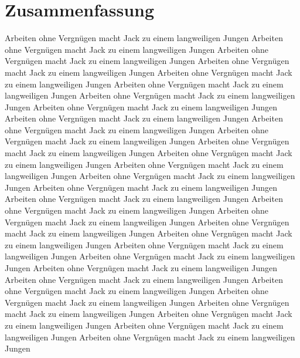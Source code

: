 \section*{Zusammenfassung}

Arbeiten ohne Vergnügen macht Jack zu einem langweiligen Jungen
Arbeiten ohne Vergnügen macht Jack zu einem langweiligen Jungen
Arbeiten ohne Vergnügen macht Jack zu einem langweiligen Jungen
Arbeiten ohne Vergnügen macht Jack zu einem langweiligen Jungen
Arbeiten ohne Vergnügen macht Jack zu einem langweiligen Jungen
Arbeiten ohne Vergnügen macht Jack zu einem langweiligen Jungen
Arbeiten ohne Vergnügen macht Jack zu einem langweiligen Jungen
Arbeiten ohne Vergnügen macht Jack zu einem langweiligen Jungen
Arbeiten ohne Vergnügen macht Jack zu einem langweiligen Jungen
Arbeiten ohne Vergnügen macht Jack zu einem langweiligen Jungen
Arbeiten ohne Vergnügen macht Jack zu einem langweiligen Jungen
Arbeiten ohne Vergnügen macht Jack zu einem langweiligen Jungen
Arbeiten ohne Vergnügen macht Jack zu einem langweiligen Jungen
Arbeiten ohne Vergnügen macht Jack zu einem langweiligen Jungen
Arbeiten ohne Vergnügen macht Jack zu einem langweiligen Jungen
Arbeiten ohne Vergnügen macht Jack zu einem langweiligen Jungen
Arbeiten ohne Vergnügen macht Jack zu einem langweiligen Jungen
Arbeiten ohne Vergnügen macht Jack zu einem langweiligen Jungen
Arbeiten ohne Vergnügen macht Jack zu einem langweiligen Jungen
Arbeiten ohne Vergnügen macht Jack zu einem langweiligen Jungen
Arbeiten ohne Vergnügen macht Jack zu einem langweiligen Jungen
Arbeiten ohne Vergnügen macht Jack zu einem langweiligen Jungen
Arbeiten ohne Vergnügen macht Jack zu einem langweiligen Jungen
Arbeiten ohne Vergnügen macht Jack zu einem langweiligen Jungen
Arbeiten ohne Vergnügen macht Jack zu einem langweiligen Jungen
Arbeiten ohne Vergnügen macht Jack zu einem langweiligen Jungen
Arbeiten ohne Vergnügen macht Jack zu einem langweiligen Jungen
Arbeiten ohne Vergnügen macht Jack zu einem langweiligen Jungen
Arbeiten ohne Vergnügen macht Jack zu einem langweiligen Jungen
Arbeiten ohne Vergnügen macht Jack zu einem langweiligen Jungen
Arbeiten ohne Vergnügen macht Jack zu einem langweiligen Jungen